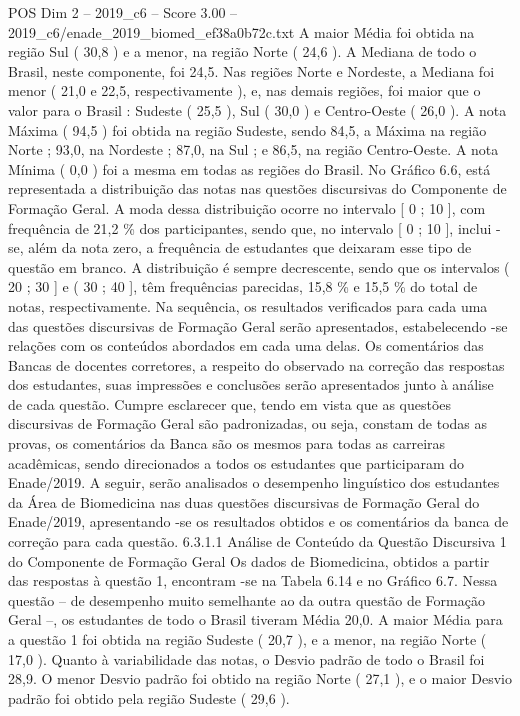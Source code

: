 \begin{textsample}{POS Dim 2 – 2019\_c6 – Score 3.00 – 2019\_c6/enade\_2019\_biomed\_ef38a0b72c.txt}
A maior Média foi obtida na região Sul ( 30,8 ) e a menor, na região Norte ( 24,6 ).
A Mediana de todo o Brasil, neste componente, foi 24,5.
Nas regiões Norte e Nordeste, a Mediana foi menor ( 21,0 e 22,5, respectivamente ), e, nas demais regiões, foi maior que o valor para o Brasil : Sudeste ( 25,5 ), Sul ( 30,0 ) e Centro-Oeste ( 26,0 ).
A nota Máxima ( 94,5 ) foi obtida na região Sudeste, sendo 84,5, a Máxima na região Norte ; 93,0, na Nordeste ; 87,0, na Sul ; e 86,5, na região Centro-Oeste.
A nota Mínima ( 0,0 ) foi a mesma em todas as regiões do Brasil.
No Gráfico 6.6, está representada a distribuição das notas nas questões discursivas do Componente de Formação Geral.
A moda dessa distribuição ocorre no intervalo [ 0 ; 10 ], com frequência de 21,2 \% dos participantes, sendo que, no intervalo [ 0 ; 10 ], inclui -se, além da nota zero, a frequência de estudantes que deixaram esse tipo de questão em branco.
A distribuição é sempre decrescente, sendo que os intervalos ( 20 ; 30 ] e ( 30 ; 40 ], têm frequências parecidas, 15,8 \% e 15,5 \% do total de notas, respectivamente.
Na sequência, os resultados verificados para cada uma das questões discursivas de Formação Geral serão apresentados, estabelecendo -se relações com os conteúdos abordados em cada uma delas.
Os comentários das Bancas de docentes corretores, a respeito do observado na correção das respostas dos estudantes, suas impressões e conclusões serão apresentados junto à análise de cada questão.
Cumpre esclarecer que, tendo em vista que as questões discursivas de Formação Geral são padronizadas, ou seja, constam de todas as provas, os comentários da Banca são os mesmos para todas as carreiras acadêmicas, sendo direcionados a todos os estudantes que participaram do Enade/2019.
A seguir, serão analisados o desempenho linguístico dos estudantes da Área de Biomedicina nas duas questões discursivas de Formação Geral do Enade/2019, apresentando -se os resultados obtidos e os comentários da banca de correção para cada questão. 6.3.1.1 Análise de Conteúdo da Questão Discursiva 1 do Componente de Formação Geral Os dados de Biomedicina, obtidos a partir das respostas à questão 1, encontram -se na Tabela 6.14 e no Gráfico 6.7.
Nessa questão – de desempenho muito semelhante ao da outra questão de Formação Geral –, os estudantes de todo o Brasil tiveram Média 20,0.
A maior Média para a questão 1 foi obtida na região Sudeste ( 20,7 ), e a menor, na região Norte ( 17,0 ).
Quanto à variabilidade das notas, o Desvio padrão de todo o Brasil foi 28,9.
O menor Desvio padrão foi obtido na região Norte ( 27,1 ), e o maior Desvio padrão foi obtido pela região Sudeste ( 29,6 ).

\end{textsample}
